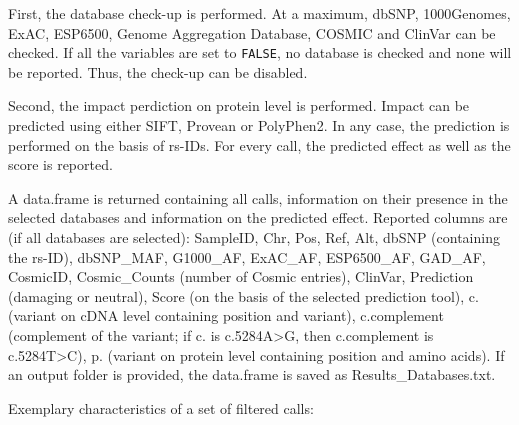 \documentclass{article}
\begin{document}
First, the database check-up is performed. At a maximum, dbSNP, 1000Genomes, ExAC, ESP6500, Genome Aggregation Database, COSMIC and ClinVar can be checked. If all the variables are set to \texttt{FALSE}, no database is checked and none will be reported. Thus, the check-up can be disabled.

Second, the impact perdiction on protein level is performed. Impact can be predicted using either SIFT, Provean or PolyPhen2. In any case, the prediction is performed on the basis of rs-IDs. For every call, the predicted effect as well as the score is reported.

A data.frame is returned containing all calls, information on their presence in the selected databases and information on the predicted effect.  Reported columns are (if all databases are selected): SampleID, Chr, Pos, Ref, Alt, dbSNP (containing the rs-ID), dbSNP\_MAF, G1000\_AF, ExAC\_AF, ESP6500\_AF, GAD\_AF, CosmicID, Cosmic\_Counts (number of Cosmic entries), ClinVar, Prediction (damaging or neutral), Score (on the basis of the selected prediction tool), c. (variant on cDNA level containing position and variant), c.complement (complement of the variant; if c. is c.5284A>G, then c.complement is c.5284T>C), p. (variant on protein level containing position and amino acids). If an output folder is provided, the data.frame is saved as Results\_Databases.txt.

Exemplary characteristics of a set of filtered calls:
\end{document}
